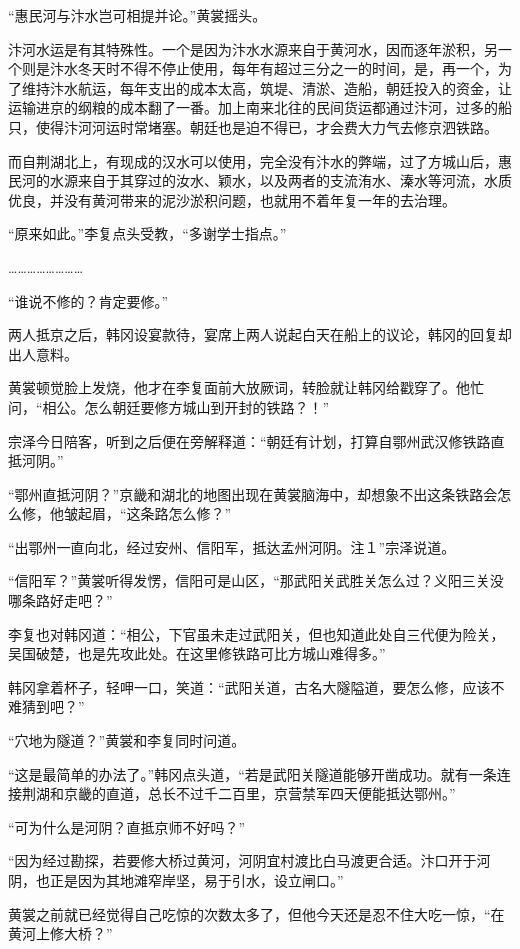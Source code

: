 “惠民河与汴水岂可相提并论。”黄裳摇头。

汴河水运是有其特殊性。一个是因为汴水水源来自于黄河水，因而逐年淤积，另一个则是汴水冬天时不得不停止使用，每年有超过三分之一的时间，是，再一个，为了维持汴水航运，每年支出的成本太高，筑堤、清淤、造船，朝廷投入的资金，让运输进京的纲粮的成本翻了一番。加上南来北往的民间货运都通过汴河，过多的船只，使得汴河河运时常堵塞。朝廷也是迫不得已，才会费大力气去修京泗铁路。

而自荆湖北上，有现成的汉水可以使用，完全没有汴水的弊端，过了方城山后，惠民河的水源来自于其穿过的汝水、颖水，以及两者的支流洧水、溱水等河流，水质优良，并没有黄河带来的泥沙淤积问题，也就用不着年复一年的去治理。

“原来如此。”李复点头受教，“多谢学士指点。”

……………………

“谁说不修的？肯定要修。”

两人抵京之后，韩冈设宴款待，宴席上两人说起白天在船上的议论，韩冈的回复却出人意料。

黄裳顿觉脸上发烧，他才在李复面前大放厥词，转脸就让韩冈给戳穿了。他忙问，“相公。怎么朝廷要修方城山到开封的铁路？！”

宗泽今日陪客，听到之后便在旁解释道：“朝廷有计划，打算自鄂州武汉修铁路直抵河阴。”

“鄂州直抵河阴？”京畿和湖北的地图出现在黄裳脑海中，却想象不出这条铁路会怎么修，他皱起眉，“这条路怎么修？”

“出鄂州一直向北，经过安州、信阳军，抵达孟州河阴。注１”宗泽说道。

“信阳军？”黄裳听得发愣，信阳可是山区，“那武阳关武胜关怎么过？义阳三关没哪条路好走吧？”

李复也对韩冈道：“相公，下官虽未走过武阳关，但也知道此处自三代便为险关，吴国破楚，也是先攻此处。在这里修铁路可比方城山难得多。”

韩冈拿着杯子，轻呷一口，笑道：“武阳关道，古名大隧隘道，要怎么修，应该不难猜到吧？”

“穴地为隧道？”黄裳和李复同时问道。

“这是最简单的办法了。”韩冈点头道，“若是武阳关隧道能够开凿成功。就有一条连接荆湖和京畿的直道，总长不过千二百里，京营禁军四天便能抵达鄂州。”

“可为什么是河阴？直抵京师不好吗？”

“因为经过勘探，若要修大桥过黄河，河阴宜村渡比白马渡更合适。汴口开于河阴，也正是因为其地滩窄岸坚，易于引水，设立闸口。”

黄裳之前就已经觉得自己吃惊的次数太多了，但他今天还是忍不住大吃一惊，“在黄河上修大桥？”

